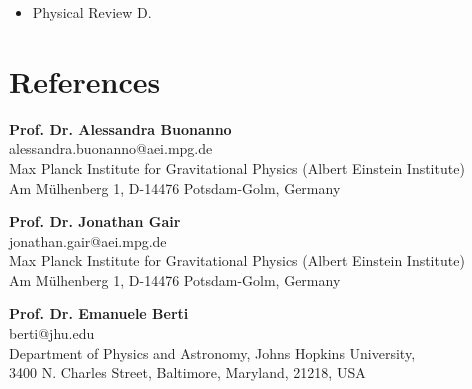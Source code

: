 \documentclass[11pt,a4paper,sans]{moderncv}        %
\begin{document}
	\vspace{-10pt}
	\vspace{-10pt}
	\vspace{-10pt}
		\begin{itemize}
		\item Physical Review D.
	\end{itemize}

\vspace{5pt}

	\section{References}

    \vspace{7pt}
    
\textbf{Prof. Dr. Alessandra Buonanno}\\
alessandra.buonanno@aei.mpg.de\\
Max Planck Institute for Gravitational Physics (Albert Einstein Institute)\\
Am Mülhenberg 1, D-14476 Potsdam-Golm, Germany

    \vspace{7pt}

\textbf{Prof. Dr. Jonathan Gair}\\
jonathan.gair@aei.mpg.de\\
Max Planck Institute for Gravitational Physics (Albert Einstein Institute)\\
Am Mülhenberg 1, D-14476 Potsdam-Golm, Germany

    \vspace{7pt}

\textbf{Prof. Dr. Emanuele Berti}\\
berti@jhu.edu\\
Department of Physics and Astronomy, Johns Hopkins University,\\
3400 N. Charles Street, Baltimore, Maryland, 21218, USA
    
%    
    
\end{document}
